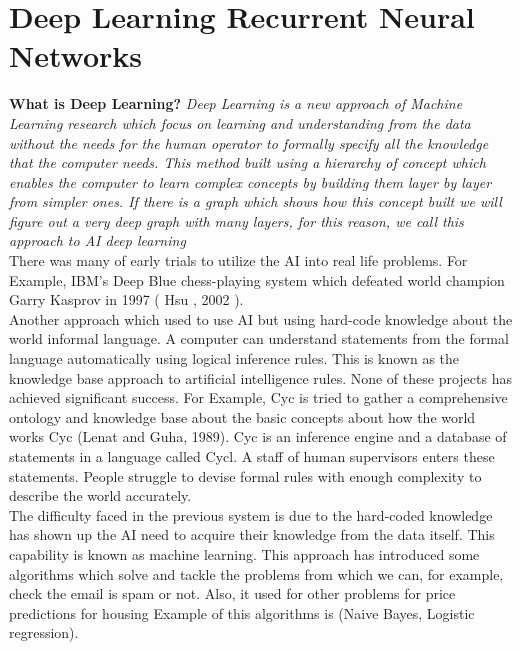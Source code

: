   \section{Deep Learning Recurrent Neural Networks}
\textbf{What is Deep Learning?} \textit{ Deep Learning is a new approach of Machine Learning research which focus on learning and understanding from the data without the needs for the human operator to formally specify all the knowledge that the computer needs. This method built using a hierarchy of concept which enables the computer to learn complex concepts by building them layer by layer from simpler ones. If there is a graph which shows how this concept built we will figure out a very deep graph with many layers, for this reason, we call this approach to AI deep learning \cite{Goodfellow-et-al-2016}
      }\\

      There was many of early trials to utilize the AI into real life problems. For Example, IBM's Deep Blue chess-playing system which defeated world champion Garry Kasprov in 1997 ( Hsu , 2002 ).%
      \\


      Another approach which used to use AI but using hard-code knowledge about the world informal language. A computer can understand statements from the formal language automatically using logical inference rules. This is known as the knowledge base approach to artificial intelligence rules. None of these projects has achieved significant success. For Example, Cyc is tried to gather a comprehensive ontology and knowledge base about the basic concepts about how the world works Cyc  (Lenat and Guha, 1989). Cyc is an inference engine and a database of statements in a language called Cycl. A staff of human supervisors enters these statements. People struggle to devise formal rules with enough complexity to describe the world accurately\cite{Goodfellow-et-al-2016}.\\

      The difficulty faced in the previous system is due to the hard-coded knowledge has shown up the AI need to acquire their knowledge from the data itself. This capability is known as machine learning. This approach has introduced some algorithms which solve and tackle the problems from which we can, for example, check the email is spam or not. Also, it used for other problems for price predictions for housing Example of this algorithms is (Naive Bayes, Logistic regression).

